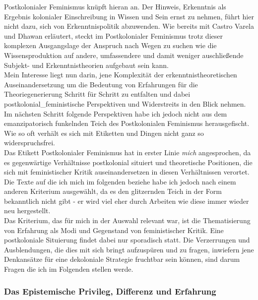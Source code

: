 \noindent Postkolonialer Feminismus knüpft hieran an. Der Hinweis, Erkenntnis als
Ergebnis kolonialer Einschreibung in Wissen und Sein ernst zu nehmen, führt
hier nicht dazu, sich von Erkenntnispolitik abzuwenden. Wie bereits mit Castro
Varela und Dhawan erläutert, steckt im Postkolonialer Feminismus trotz dieser
komplexen Ausgangslage der Anspruch nach Wegen zu suchen wie die
Wissensproduktion auf andere, umfassendere und damit weniger auschließende
Subjekt- und Erkenntnistheorien aufgebaut sein kann. \\
Mein Interesse liegt nun
darin, jene Komplexität der erkenntnistheoretischen Auseinandersetzung um die
Bedeutung von Erfahrungen für die Theoriegenerierung Schritt für Schritt zu
entfalten und dabei postkolonial\_feministische Perspektiven und Widerstreits in
den Blick nehmen. Im nächsten Schritt folgende Perspektiven habe ich jedoch
nicht aus dem emanzipatorisch funkelnden Teich des Postkolonialen Feminismus
herausgefischt. Wie so oft verhält es sich mit Etiketten und Dingen nicht ganz
so widerspruchsfrei.\\

\noindent Das Etikett Postkolonialer Feminismus hat in erster Linie \textit{mich} angesprochen, da
es gegenwärtige Verhältnisse postkolonial situiert und theoretische Positionen,
die sich mit feministischer Kritik auseinandersetzen in diesen Verhältnissen
verortet. \\
Die Texte auf die ich mich im folgenden beziehe habe ich jedoch nach
einem anderen Kriterium ausgewählt, da es den glitzernden Teich in der Form
bekanntlich nicht gibt - er wird viel eher durch Arbeiten wie diese immer
wieder neu hergestellt.\\
 Das Kriterium, das für mich in der Auswahl relevant
war, ist die Thematisierung von Erfahrung als Modi und Gegenstand von
feministischer Kritik. Eine postkoloniale Situierung findet dabei nur
sporadisch statt. Die Verzerrungen und Ausblendungen, die dies mit sich bringt
aufzuspüren und zu fragen, inwiefern jene Denkansätze für eine dekoloniale
Strategie fruchtbar sein können, sind darum Fragen die ich im Folgenden stellen
werde.

\subsubsection{Das Epistemische Privileg, Differenz und Erfahrung}

